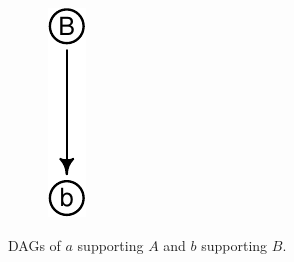 \documentclass[
  10pt,
  dvipsnames,enabledeprecatedfontcommands]{scrartcl}
\begin{document}
\begin{figure}[h]
\begin{subfigure}[!ht]{0.45\textwidth}
\begin{center}\includegraphics[width=0.6\linewidth]{conjunction-paradox4_files/figure-latex/fig:bBDAG-1} \end{center}
\end{subfigure}
\caption{\textsf{DAG}s of $a$ supporting $A$ and $b$ supporting $B$.}
\label{fig:abBDAG}
\end{figure}
\end{document}
